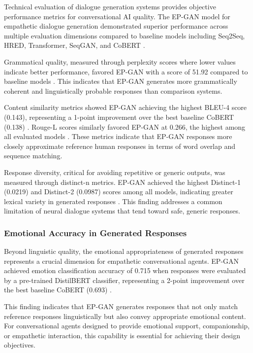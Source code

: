 \documentclass[manuscript,anonymous,sigconf]{acmart}
\begin{document}
Technical evaluation of dialogue generation systems provides objective performance metrics for conversational AI quality. The EP-GAN model for empathetic dialogue generation demonstrated superior performance across multiple evaluation dimensions compared to baseline models including Seq2Seq, HRED, Transformer, SeqGAN, and CoBERT \cite{A47}.

Grammatical quality, measured through perplexity scores where lower values indicate better performance, favored EP-GAN with a score of 51.92 compared to baseline models \cite{A47}. This indicates that EP-GAN generates more grammatically coherent and linguistically probable responses than comparison systems.

Content similarity metrics showed EP-GAN achieving the highest BLEU-4 score (0.143), representing a 1-point improvement over the best baseline CoBERT (0.138) \cite{A47}. Rouge-L scores similarly favored EP-GAN at 0.266, the highest among all evaluated models \cite{A47}. These metrics indicate that EP-GAN responses more closely approximate reference human responses in terms of word overlap and sequence matching.

Response diversity, critical for avoiding repetitive or generic outputs, was measured through distinct-n metrics. EP-GAN achieved the highest Distinct-1 (0.0219) and Distinct-2 (0.0987) scores among all models, indicating greater lexical variety in generated responses \cite{A47}. This finding addresses a common limitation of neural dialogue systems that tend toward safe, generic responses.

\subsubsection{Emotional Accuracy in Generated Responses}

Beyond linguistic quality, the emotional appropriateness of generated responses represents a crucial dimension for empathetic conversational agents. EP-GAN achieved emotion classification accuracy of 0.715 when responses were evaluated by a pre-trained DistilBERT classifier, representing a 2-point improvement over the best baseline CoBERT (0.693) \cite{A47}.

This finding indicates that EP-GAN generates responses that not only match reference responses linguistically but also convey appropriate emotional content. For conversational agents designed to provide emotional support, companionship, or empathetic interaction, this capability is essential for achieving their design objectives.
\end{document}
